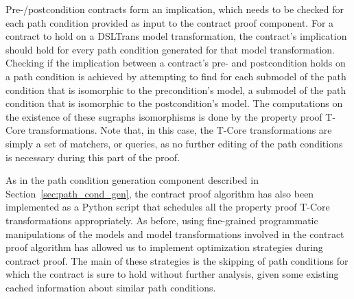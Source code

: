 Pre-/postcondition contracts form an implication, which needs to be checked for
each path condition provided as input to the contract proof component. For a
contract to hold on a DSLTrans model transformation, the contract's implication
should hold for every path condition generated for that model transformation.
Checking if the implication between a contract's pre- and postcondition holds on
a path condition is achieved by attempting to find for each submodel of the path
condition that is isomorphic to the precondition's model, a submodel of the path
condition that is isomorphic to the postcondition's model.
The computations on the existence of these sugraphs isomorphisms is done by the
property proof T-Core transformations. Note
that, in this case, the T-Core transformations are simply a set of matchers, or
queries, as no further editing of the path conditions is necessary during this
part of the proof.

As in the path condition generation component described in
Section~\ref{sec:path_cond_gen}, the contract proof algorithm has also been
implemented as a Python script that schedules all the property proof T-Core
transformations appropriately. As before, using fine-grained programmatic
manipulations of the models and model transformations involved in the contract
proof algorithm has allowed us to implement optimization strategies during
contract proof. The main of these strategies is the skipping of path conditions
for which the contract is sure to hold without further analysis, given some
existing cached information about similar path conditions.


